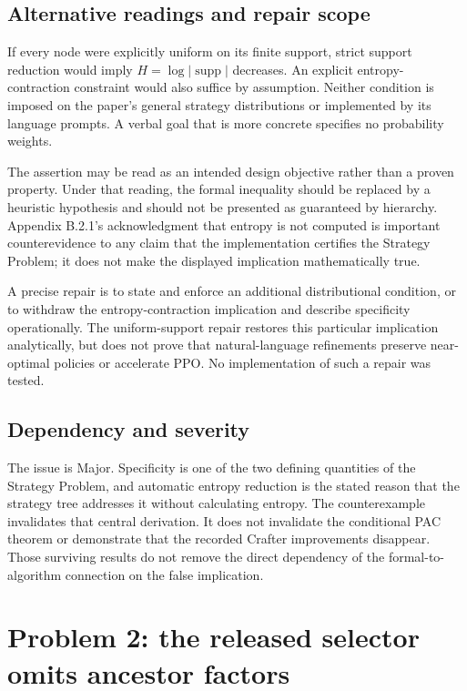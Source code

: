 \documentclass[10pt]{article}
\begin{document}
\subsection*{Alternative readings and repair scope}
If every node were explicitly uniform on its finite support, strict support reduction would imply \(H=\log|\operatorname{supp}|\) decreases. An explicit entropy-contraction constraint would also suffice by assumption. Neither condition is imposed on the paper’s general strategy distributions or implemented by its language prompts. A verbal goal that is more concrete specifies no probability weights.\par
The assertion may be read as an intended design objective rather than a proven property. Under that reading, the formal inequality should be replaced by a heuristic hypothesis and should not be presented as guaranteed by hierarchy. Appendix B.2.1’s acknowledgment that entropy is not computed is important counterevidence to any claim that the implementation certifies the Strategy Problem; it does not make the displayed implication mathematically true.\par
A precise repair is to state and enforce an additional distributional condition, or to withdraw the entropy-contraction implication and describe specificity operationally. The uniform-support repair restores this particular implication analytically, but does not prove that natural-language refinements preserve near-optimal policies or accelerate PPO. No implementation of such a repair was tested.\par
\subsection*{Dependency and severity}
The issue is Major. Specificity is one of the two defining quantities of the Strategy Problem, and automatic entropy reduction is the stated reason that the strategy tree addresses it without calculating entropy. The counterexample invalidates that central derivation. It does not invalidate the conditional PAC theorem or demonstrate that the recorded Crafter improvements disappear. Those surviving results do not remove the direct dependency of the formal-to-algorithm connection on the false implication.\par
\section*{Problem 2: the released selector omits ancestor factors}
\end{document}
